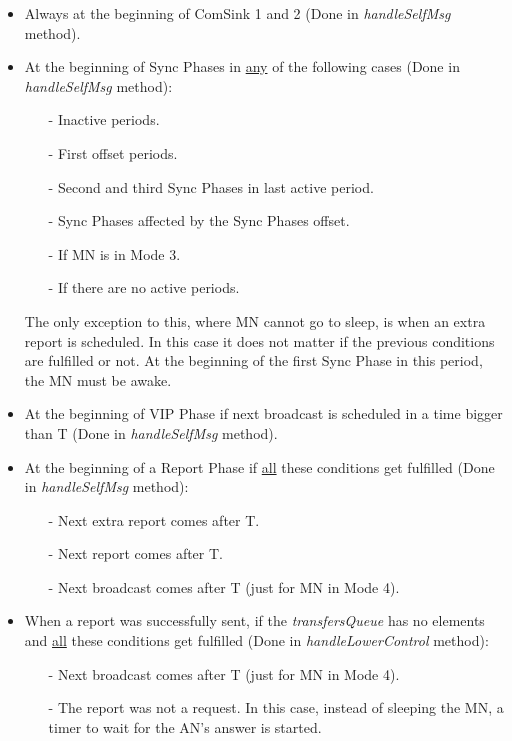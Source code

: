 \begin{itemize}
 \item Always at the beginning of ComSink 1 and 2 (Done in \textit{handleSelfMsg} method).
 
 \item At the beginning of Sync Phases in \underline{any} of the following cases (Done in \textit{handleSelfMsg} method):
    \begin{itemize}
      \item[-] Inactive periods.
      \item[-] First offset periods.
      \item[-] Second and third Sync Phases in last active period.
      \item[-] Sync Phases affected by the Sync Phases offset.
      \item[-] If \ac{MN} is in Mode 3.
      \item[-] If there are no active periods.
    \end{itemize}
  The only exception to this, where \ac{MN} cannot go to sleep, is when an extra report is scheduled. In this case it does not matter if the 
  previous conditions are fulfilled or not. At the beginning of the first Sync Phase in this period, the \ac{MN} must be awake.

 \item At the beginning of \ac{VIP} Phase if next broadcast is scheduled in a time bigger than T (Done in \textit{handleSelfMsg} method).

 \item At the beginning of a Report Phase if \underline{all} these conditions get fulfilled (Done in \textit{handleSelfMsg} method):
    \begin{itemize}
      \item[-] Next extra report comes after T.
      \item[-] Next report comes after T.
      \item[-] Next broadcast comes after T (just for \ac{MN} in Mode 4).
    \end{itemize}

  \item When a report was successfully sent, if the \textit{transfersQueue} has no elements and \underline{all} these conditions get fulfilled 
  (Done in \textit{handleLowerControl} method):
    \begin{itemize}
      \item[-] Next broadcast comes after T (just for \ac{MN} in Mode 4).
      \item[-] The report was not a request. In this case, instead of sleeping the \ac{MN}, a timer to wait for the \ac{AN}'s answer is started.
    \end{itemize}


\end{itemize}
